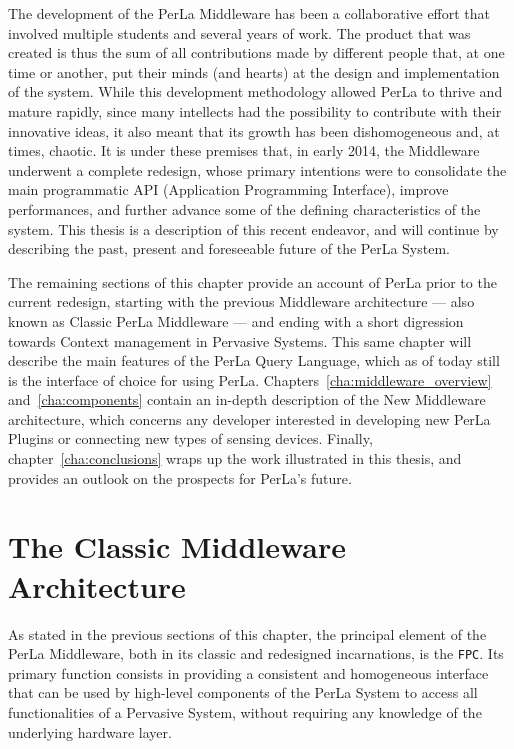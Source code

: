 The development of the PerLa Middleware has been a collaborative effort that
involved multiple students and several years of work. The product that was
created is thus the sum of all contributions made by different people that, at
one time or another, put their minds (and hearts) at the design and
implementation of the system. While this development methodology allowed PerLa
to thrive and mature rapidly, since many intellects had the possibility to
contribute with their innovative ideas, it also meant that its growth has been
dishomogeneous and, at times, chaotic. It is under these premises that, in
early 2014, the Middleware underwent a complete redesign, whose primary
intentions were to consolidate the main programmatic API (Application
Programming Interface), improve performances, and further advance some of the
defining characteristics of the system. This thesis is a description of this
recent endeavor, and will continue by describing the past, present and
foreseeable future of the PerLa System.

The remaining sections of this chapter provide an account of PerLa prior to the
current redesign, starting with the previous Middleware architecture --- also
known as Classic PerLa Middleware --- and ending with a short digression
towards Context management in Pervasive Systems. This same chapter will
describe the main features of the PerLa Query Language, which as of today still
is the interface of choice for using PerLa.
Chapters~\ref{cha:middleware_overview} and~\ref{cha:components} contain an
in-depth description of the New Middleware architecture, which concerns any
developer interested in developing new PerLa Plugins or connecting new types of
sensing devices. Finally, chapter~\ref{cha:conclusions} wraps up the work
illustrated in this thesis, and provides an outlook on the prospects for
PerLa's future.


\section{The Classic Middleware Architecture}

As stated in the previous sections of this chapter, the principal element of
the PerLa Middleware, both in its classic and redesigned incarnations, is the
\texttt{FPC}. Its primary function consists in providing a consistent and
homogeneous interface that can be used by high-level components of the PerLa
System to access all functionalities of a Pervasive System, without requiring
any knowledge of the underlying hardware layer.

